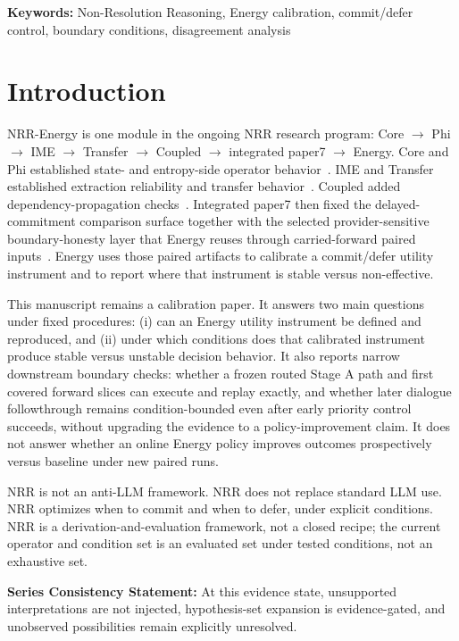 \documentclass[11pt,a4paper]{article}
\begin{document}
\noindent\textbf{Keywords:} Non-Resolution Reasoning, Energy calibration, commit/defer control, boundary conditions, disagreement analysis

\section{Introduction}
\label{sec:intro}

NRR-Energy is one module in the ongoing NRR research program:
Core $\rightarrow$ Phi $\rightarrow$ IME $\rightarrow$ Transfer $\rightarrow$ Coupled $\rightarrow$ integrated paper7 $\rightarrow$ Energy.
Core and Phi established state- and entropy-side operator behavior~\cite{saito2025nrr,saito2026phi}. IME and Transfer established extraction reliability and transfer behavior~\cite{saito2026ime,saito2026transfer}. Coupled added dependency-propagation checks~\cite{saito2026coupled}. Integrated paper7 then fixed the delayed-commitment comparison surface together with the selected provider-sensitive boundary-honesty layer that Energy reuses through carried-forward paired inputs~\cite{saito2026principles}. Energy uses those paired artifacts to calibrate a commit/defer utility instrument and to report where that instrument is stable versus non-effective.

This manuscript remains a calibration paper. It answers two main questions under fixed procedures: (i) can an Energy utility instrument be defined and reproduced, and (ii) under which conditions does that calibrated instrument produce stable versus unstable decision behavior. It also reports narrow downstream boundary checks: whether a frozen routed Stage A path and first covered forward slices can execute and replay exactly, and whether later dialogue followthrough remains condition-bounded even after early priority control succeeds, without upgrading the evidence to a policy-improvement claim. It does not answer whether an online Energy policy improves outcomes prospectively versus baseline under new paired runs.

NRR is not an anti-LLM framework.
NRR does not replace standard LLM use.
NRR optimizes when to commit and when to defer, under explicit conditions.
NRR is a derivation-and-evaluation framework, not a closed recipe; the current operator and condition set is an evaluated set under tested conditions, not an exhaustive set.

\textbf{Series Consistency Statement:}
At this evidence state, unsupported interpretations are not injected, hypothesis-set expansion is evidence-gated, and unobserved possibilities remain explicitly unresolved.
\end{document}
